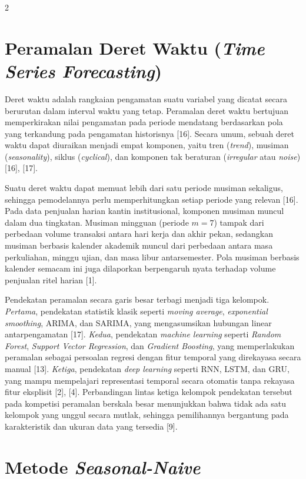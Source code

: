 \documentclass[12pt, a4paper, onecolumn, oneside]{report}
\begin{document}
\begin{spacing}{2}
\section{Peramalan Deret Waktu (\textit{Time Series Forecasting})}

Deret waktu adalah rangkaian pengamatan suatu variabel yang dicatat secara berurutan dalam interval waktu yang tetap. Peramalan deret waktu bertujuan memperkirakan nilai pengamatan pada periode mendatang berdasarkan pola yang terkandung pada pengamatan historisnya [16]. Secara umum, sebuah deret waktu dapat diuraikan menjadi empat komponen, yaitu tren (\textit{trend}), musiman (\textit{seasonality}), siklus (\textit{cyclical}), dan komponen tak beraturan (\textit{irregular} atau \textit{noise}) [16], [17].

Suatu deret waktu dapat memuat lebih dari satu periode musiman sekaligus, sehingga pemodelannya perlu memperhitungkan setiap periode yang relevan [16]. Pada data penjualan harian kantin institusional, komponen musiman muncul dalam dua tingkatan. Musiman mingguan (periode $m = 7$) tampak dari perbedaan volume transaksi antara hari kerja dan akhir pekan, sedangkan musiman berbasis kalender akademik muncul dari perbedaan antara masa perkuliahan, minggu ujian, dan masa libur antarsemester. Pola musiman berbasis kalender semacam ini juga dilaporkan berpengaruh nyata terhadap volume penjualan ritel harian [1].

Pendekatan peramalan secara garis besar terbagi menjadi tiga kelompok. \textit{Pertama}, pendekatan statistik klasik seperti \textit{moving average}, \textit{exponential smoothing}, ARIMA, dan SARIMA, yang mengasumsikan hubungan linear antarpengamatan [17]. \textit{Kedua}, pendekatan \textit{machine learning} seperti \textit{Random Forest}, \textit{Support Vector Regression}, dan \textit{Gradient Boosting}, yang memperlakukan peramalan sebagai persoalan regresi dengan fitur temporal yang direkayasa secara manual [13]. \textit{Ketiga}, pendekatan \textit{deep learning} seperti RNN, LSTM, dan GRU, yang mampu mempelajari representasi temporal secara otomatis tanpa rekayasa fitur eksplisit [2], [4]. Perbandingan lintas ketiga kelompok pendekatan tersebut pada kompetisi peramalan berskala besar menunjukkan bahwa tidak ada satu kelompok yang unggul secara mutlak, sehingga pemilihannya bergantung pada karakteristik dan ukuran data yang tersedia [9].

\section{Metode \textit{Seasonal-Naive}}


\end{spacing}
\end{document}
